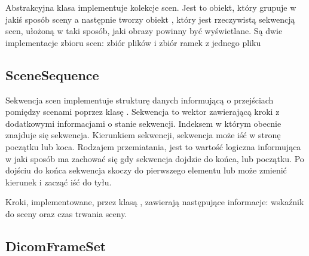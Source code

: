 \label{sec:sokar-scenesets}

Abstrakcyjna klasa  implementuje kolekcje scen.
Jest to obiekt, który grupuje w jakiś sposób sceny a następnie tworzy obiekt , który jest rzeczywistą sekwencją scen, ułożoną w taki sposób, jaki obrazy powinny być wyświetlane.
Są dwie implementacje zbioru scen: zbiór plików i zbiór ramek z jednego pliku

\subsection{SceneSequence}

\par
Sekwencja scen implementuje strukturę danych informującą o przejściach pomiędzy scenami poprzez klasę .
Sekwencja to wektor zawierającą kroki z dodatkowymi informacjami o stanie sekwencji.
Indeksem w którym obecnie znajduje się sekwencja.
Kierunkiem sekwencji, sekwencja może iść w stronę początku lub koca.
Rodzajem przemiatania, jest to wartość logiczna informująca w jaki sposób ma zachować się gdy sekwencja dojdzie do końca, lub początku.
Po dojściu do końca sekwencja skoczy do pierwszego elementu lub może zmienić kierunek i zacząć iść do tyłu.

\par
Kroki, implementowane, przez klasą , zawierają następujące informacje: wskaźnik do sceny oraz czas trwania sceny.


\subsection{DicomFrameSet}

